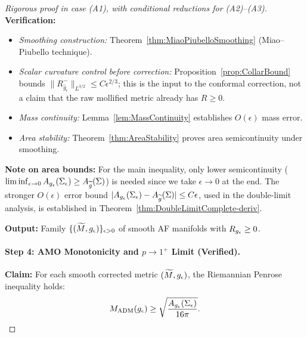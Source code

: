 \begin{proof}[Rigorous proof in case (A1), with conditional reductions for (A2)--(A3)]
\textbf{Verification:}
\begin{itemize}
    \item \textit{Smoothing construction:} Theorem~\ref{thm:MiaoPiubelloSmoothing} (Miao--Piubello technique).
    \item \textit{Scalar curvature control before correction:} Proposition~\ref{prop:CollarBound} bounds $\|R^-_{\hat{g}_\epsilon}\|_{L^{3/2}} \le C\epsilon^{2/3}$; this is the input to the conformal correction, not a claim that the raw mollified metric already has $R\ge0$.
    \item \textit{Mass continuity:} Lemma~\ref{lem:MassContinuity} establishes $O(\epsilon)$ mass error.
    \item \textit{Area stability:} Theorem~\ref{thm:AreaStability} proves area semicontinuity under smoothing.
\end{itemize}
\textbf{Note on area bounds:} For the main inequality, only lower semicontinuity ($\liminf_{\epsilon \to 0} A_{g_{\epsilon}}(\Sigma_\epsilon) \ge A_{\widetilde{g}}(\Sigma)$) is needed since we take $\epsilon \to 0$ at the end. The stronger $O(\epsilon)$ error bound $|A_{g_{\epsilon}}(\Sigma_\epsilon) - A_{\widetilde{g}}(\Sigma)| \le C\epsilon$, used in the double-limit analysis, is established in Theorem~\ref{thm:DoubleLimitComplete-deriv}.

\textbf{Output:} Family $\{(\widetilde{M}, g_{\epsilon})\}_{\epsilon > 0}$ of smooth AF manifolds with $R_{g_{\epsilon}} \ge 0$.

\paragraph{Step 4: AMO Monotonicity and $p \to 1^+$ Limit (Verified).}
\textbf{Claim:} For each smooth corrected metric $(\widetilde{M}, g_{\epsilon})$, the Riemannian Penrose inequality holds:
\begin{equation}
    M_{\mathrm{ADM}}(g_{\epsilon}) \ge \sqrt{\frac{A_{g_{\epsilon}}(\Sigma_\epsilon)}{16\pi}}.
\end{equation}


\end{proof}
